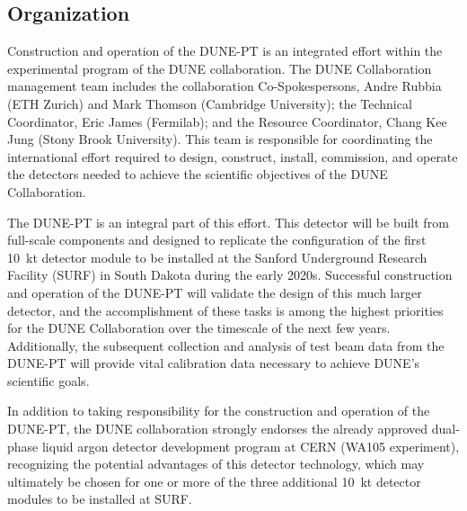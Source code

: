 \label{organ}

\subsection{Organization}

Construction and operation of the DUNE-PT is an integrated effort within the experimental program of the DUNE collaboration.  
The DUNE Collaboration management team includes the collaboration Co-Spokespersons, Andre Rubbia (ETH Zurich) and Mark Thomson 
(Cambridge University); the Technical Coordinator, Eric James (Fermilab); and the Resource Coordinator, Chang Kee Jung (Stony 
Brook University).  This team is responsible for coordinating the international effort required to design, construct, install, 
commission, and operate the detectors needed to achieve the scientific objectives of the DUNE Collaboration.  

The DUNE-PT is an integral part of this effort.  This detector will be built from full-scale components and designed to replicate 
the configuration of the first 10~kt detector module to be installed at the Sanford Underground Research Facility (SURF) in 
South Dakota during the early 2020s.  Successful construction and operation of the DUNE-PT will validate the design of this much 
larger detector, and the accomplishment of these tasks is among the highest priorities for the DUNE Collaboration over the 
timescale of the next few years.  Additionally, the subsequent collection and analysis of test beam data from the DUNE-PT will 
provide vital calibration data necessary to achieve DUNE's scientific goals.

In addition to taking responsibility for the construction and operation of the DUNE-PT, the DUNE collaboration strongly endorses 
the already approved dual-phase liquid argon detector development program at CERN (WA105 experiment), recognizing the potential 
advantages of this detector technology, which may ultimately be chosen for one or more of the three additional 10~kt detector 
modules to be installed at SURF.     


